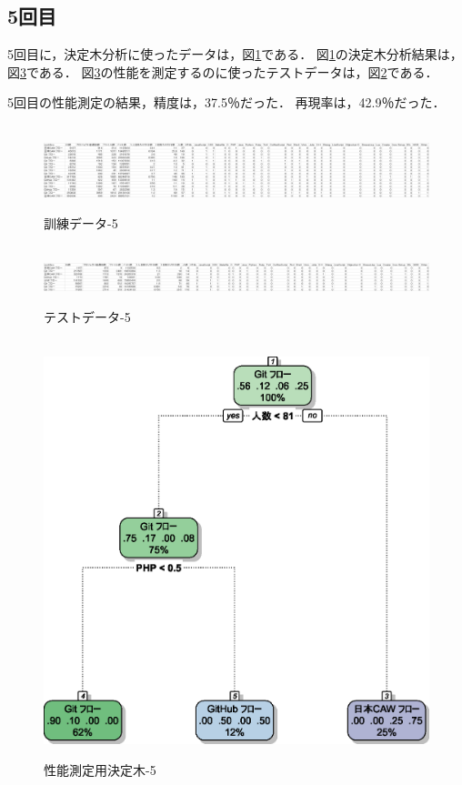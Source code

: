 \subsection{5回目}
5回目に，決定木分析に使ったデータは，図\ref{データ5-1}である．
図\ref{データ5-1}の決定木分析結果は，図\ref{決定木5}である．
図\ref{決定木5}の性能を測定するのに使ったテストデータは，図\ref{データ5-2}である．

5回目の性能測定の結果，精度は，37.5％だった．
再現率は，42.9％だった．

\begin{figure}[H]
\centering　
\includegraphics[width=13cm]{5-1.png}
\caption{訓練データ-5}\label{データ5-1}
\end{figure}
\begin{figure}[H]
\centering　
\includegraphics[width=13cm]{5-2.png}
\caption{テストデータ-5}\label{データ5-2}
\end{figure}
\begin{figure}[H]
\centering　
\includegraphics[width=13cm]{5.eps}
\caption{性能測定用決定木-5}\label{決定木5}
\end{figure}


